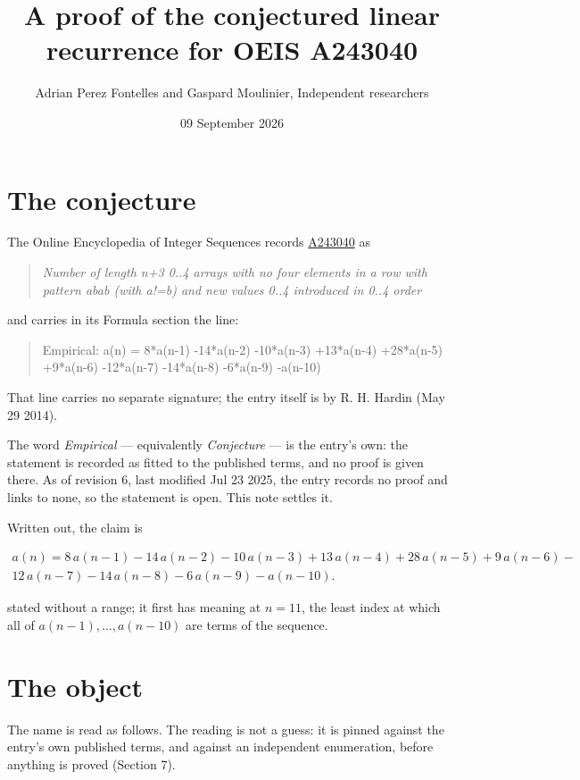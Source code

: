\documentclass[11pt]{article}
\title{A proof of the conjectured linear recurrence for OEIS A243040}
\author{Adrian Perez Fontelles and Gaspard Moulinier, Independent researchers}
\date{09 September 2026}
\theoremstyle{definition}
\begin{document}
\maketitle
\section{The conjecture}

The Online Encyclopedia of Integer Sequences records \href{https://oeis.org/A243040}{A243040} as

\begin{quote}\itshape Number of length n+3 0..4 arrays with no four elements in a row with pattern abab (with a!=b) and new values 0..4 introduced in 0..4 order\end{quote}

and carries in its Formula section the line:

\begin{quote}\ttfamily Empirical: a(n) = 8*a(n-1) -14*a(n-2) -10*a(n-3) +13*a(n-4) +28*a(n-5) +9*a(n-6) -12*a(n-7) -14*a(n-8) -6*a(n-9) -a(n-10)\end{quote}

That line carries no separate signature; the entry itself is by R. H. Hardin (May 29 2014).

The word {\itshape Empirical} --- equivalently {\itshape Conjecture} --- is the entry's own: the statement is recorded as fitted to the published terms, and no proof is given there. As of revision 6, last modified Jul 23 2025, the entry records no proof and links to none, so the statement is open. This note settles it.

Written out, the claim is

\begin{multline*} a(n) = 8\,a(n-1) - 14\,a(n-2) - 10\,a(n-3) + 13\,a(n-4) + 28\,a(n-5) + 9\,a(n-6) - \\ 12\,a(n-7) - 14\,a(n-8) - 6\,a(n-9) - a(n-10). \end{multline*}

stated without a range; it first has meaning at $n = 11$, the least index at which all of $a(n-1),\dots,a(n-10)$ are terms of the sequence.

\section{The object}

The name is read as follows. The reading is not a guess: it is pinned against the entry's own published terms, and against an independent enumeration, before anything is proved (Section 7).
\end{document}
